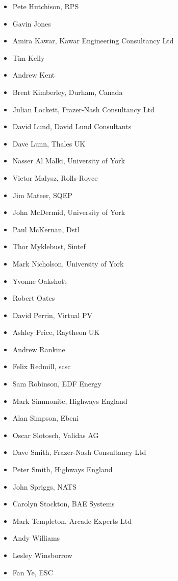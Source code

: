 \begin{itemize}
  \item Pete Hutchison, RPS
  \item Gavin Jones
  \item Amira Kawar, Kawar Engineering Consultancy Ltd
  \item Tim Kelly
  \item Andrew Kent
  \item Brent Kimberley, Durham, Canada
  \item Julian Lockett, Frazer-Nash Consultancy Ltd
  \item David Lund, David Lund Consultants
  \item Dave Lunn, Thales UK
  \item Nasser Al Malki, University of York
  \item Victor Malysz, Rolls-Royce
  \item Jim Mateer, SQEP
  \item John McDermid, University of York
  \item Paul McKernan, Dstl
  \item Thor Myklebust, Sintef
  \item Mark Nicholson, University of York
  \item Yvonne Oakshott
  \item Robert Oates
  \item David Perrin, Virtual PV
  \item Ashley Price, Raytheon UK
  \item Andrew Rankine
  \item Felix Redmill, \gls{scsc}
  \item Sam Robinson, EDF Energy
  \item Mark Simmonite, Highways England
  \item Alan Simpson, Ebeni
  \item Oscar Slotosch, Validas AG
  \item Dave Smith, Frazer-Nash Consultancy Ltd
  \item Peter Smith, Highways England
  \item John Spriggs, NATS
  \item Carolyn Stockton, BAE Systems
  \item Mark Templeton, Arcade Experts Ltd
  \item Andy Williams
  \item Lesley Winsborrow
  \item Fan Ye, ESC
\end{itemize}
